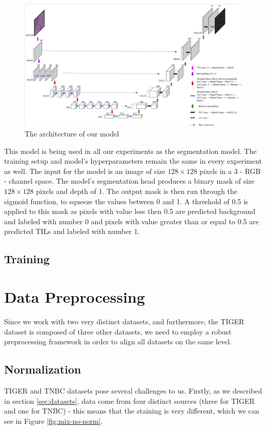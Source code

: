 \begin{figure}[H]
\begin{centering}
\includegraphics[width=\textwidth]{assets/images/for_presentation/our_architecture.png}
\par\end{centering}
\caption{The architecture of our model 
\label{fig:our-architecture}}
\end{figure}

This model is being used in all our experiments as the segmentation model. The training setup and model's hyperparameters remain the same in every experiment as well. The input for the model is an image of size $128\times128$ pixels in a 3 - RGB - channel space. The model's segmentation head produces a binary mask of size $128\times128$ pixels and depth of 1. The output mask is then run through the sigmoid function, to squeeze the values between 0 and 1. A threshold of 0.5 is applied to this mask as pixels with value less then 0.5 are predicted background and labeled with number 0 and pixels with value greater than or equal to 0.5 are predicted TILs and labeled with number 1.

\subsection{Training}


\section{Data Preprocessing}
Since we work with two very distinct datasets, and furthermore, the TIGER dataset is composed of three other datasets, we need to employ a robust preprocessing framework in order to align all datasets on the same level.

\subsection{Normalization} 
TIGER and TNBC datasets pose several challenges to us. Firstly, as we described in section \ref{sec:datasets}, data come from four distinct sources (three for TIGER and one for TNBC) - this means that the staining is very different, which we can see in Figure \ref{fig:mix-no-norm}.

